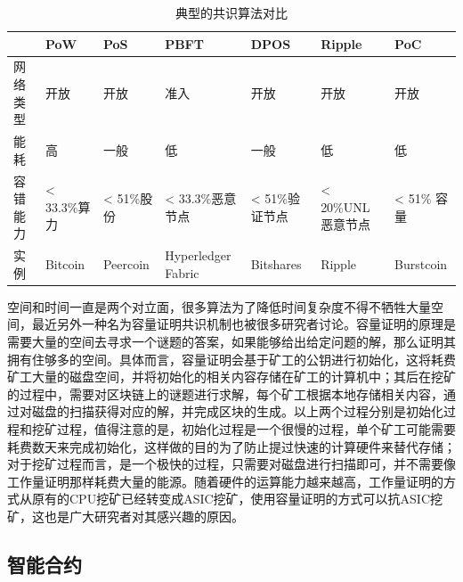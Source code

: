 \begin{table}[h] %
\centering   
\newcommand{\tabincell}[2]{\begin{tabular}{@{}#1@{}}#2\end{tabular}}
\begin{tabular}{p{1.2cm}|p{1.8cm}p{1.8cm}p{2cm}p{2cm}p{2cm}p{2.2cm}} %
 
\hline  
 & PoW\cite{nakamoto2008bitcoin} & PoS\cite{vasin2014blackcoin} &  PBFT\cite{castro1999practical} & DPOS\cite{larimer2014delegated} & Ripple\cite{schwartz2014ripple} & PoC\cite{ateniese2014proofs} \\
\hline
网络类型& 开放 & 开放 & 准入 & 开放 & 开放 & 开放 \\
能耗 &  高 & 一般 & 低 & 一般 & 低 & 低 \\
容错能力 & < 33.3\%算力\cite{eyal2014majority} & < 51\%股份 & < 33.3\%恶意节点 & < 51\%验证节点 & < 20\%UNL恶意节点 & < 51\% 容量 \\
实例 & Bitcoin & Peercoin & Hyperledger Fabric & Bitshares & Ripple & Burstcoin \\
 
\hline  
\end{tabular}  
\caption{典型的共识算法对比}\label{table:consensus} %
\end{table}  


空间和时间一直是两个对立面，很多算法为了降低时间复杂度不得不牺牲大量空间，最近另外一种名为容量证明共识机制也被很多研究者讨论。容量证明\cite{ateniese2014proofs}的原理是需要大量的空间去寻求一个谜题的答案，如果能够给出给定问题的解，那么证明其拥有住够多的空间。具体而言，容量证明会基于矿工的公钥进行初始化，这将耗费矿工大量的磁盘空间，并将初始化的相关内容存储在矿工的计算机中；其后在挖矿的过程中，需要对区块链上的谜题进行求解，每个矿工根据本地存储相关内容，通过对磁盘的扫描获得对应的解，并完成区块的生成。以上两个过程分别是初始化过程和挖矿过程，值得注意的是，初始化过程是一个很慢的过程，单个矿工可能需要耗费数天来完成初始化，这样做的目的为了防止提过快速的计算硬件来替代存储；对于挖矿过程而言，是一个极快的过程，只需要对磁盘进行扫描即可，并不需要像工作量证明那样耗费大量的能源。随着硬件的运算能力越来越高，工作量证明的方式从原有的CPU挖矿已经转变成ASIC挖矿，使用容量证明的方式可以抗ASIC挖矿，这也是广大研究者对其感兴趣的原因。


\subsection{智能合约}

